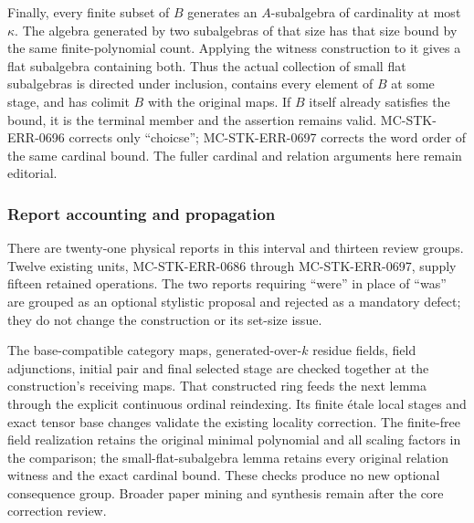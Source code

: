 Finally, every finite subset of \(B\) generates an \(A\)-subalgebra of cardinality at most \(\kappa\). The algebra generated by two subalgebras of that size has that size bound by the same finite-polynomial count. Applying the witness construction to it gives a flat subalgebra containing both. Thus the actual collection of small flat subalgebras is directed under inclusion, contains every element of \(B\) at some stage, and has colimit \(B\) with the original maps. If \(B\) itself already satisfies the bound, it is the terminal member and the assertion remains valid. MC-STK-ERR-0696 corrects only ``choicse''; MC-STK-ERR-0697 corrects the word order of the same cardinal bound. The fuller cardinal and relation arguments here remain editorial.

\subsubsection{Report accounting and propagation}\label{report-accounting-and-propagation}

There are twenty-one physical reports in this interval and thirteen review groups. Twelve existing units, MC-STK-ERR-0686 through MC-STK-ERR-0697, supply fifteen retained operations. The two reports requiring ``were'' in place of ``was'' are grouped as an optional stylistic proposal and rejected as a mandatory defect; they do not change the construction or its set-size issue.

The base-compatible category maps, generated-over-\(k\) residue fields, field adjunctions, initial pair and final selected stage are checked together at the construction's receiving maps. That constructed ring feeds the next lemma through the explicit continuous ordinal reindexing. Its finite étale local stages and exact tensor base changes validate the existing locality correction. The finite-free field realization retains the original minimal polynomial and all scaling factors in the comparison; the small-flat-subalgebra lemma retains every original relation witness and the exact cardinal bound. These checks produce no new optional consequence group. Broader paper mining and synthesis remain after the core correction review.
